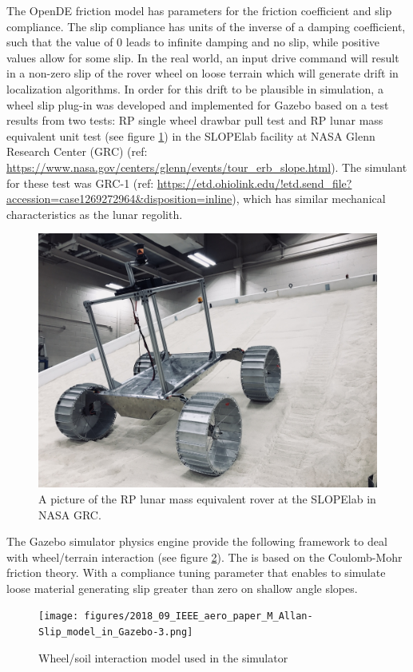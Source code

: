 \documentclass[twocolumn,letterpaper]{IEEEAerospaceCLS}  %
\begin{document}
The OpenDE friction model has parameters for the friction coefficient and slip compliance.
The slip compliance has units of the inverse of a damping coefficient,
such that the value of 0 leads to infinite damping and no slip,
while positive values allow for some slip.
In the real world, an input drive command will result in a non-zero slip of the rover wheel on loose terrain which will generate drift in localization algorithms.
In order for this drift to be plausible in simulation, a wheel slip plug-in was developed and implemented for Gazebo based on a test results from two tests: RP single wheel drawbar pull test and RP lunar mass equivalent unit test (see figure \ref{fig:mgru}) in the SLOPElab facility at NASA Glenn Research Center (GRC) (ref: \url{https://www.nasa.gov/centers/glenn/events/tour_erb_slope.html}). The simulant for these test was GRC-1 (ref: \url{https://etd.ohiolink.edu/!etd.send_file?accession=case1269272964&disposition=inline}), which has similar mechanical characteristics as the lunar regolith. 
\begin{figure}[h!]
	\includegraphics[width=\columnwidth]{figures/wheel_slip_MGRU.JPG}
   	\caption{A picture of the RP lunar mass equivalent rover at the SLOPElab in NASA GRC.}
    \label{fig:mgru}
\end{figure}
The Gazebo simulator physics engine provide the following framework to deal with wheel/terrain interaction (see figure \ref{fig:wheelsoilmodel}). The is based on the Coulomb-Mohr friction theory. With a compliance tuning parameter that enables to simulate loose material generating slip greater than zero on shallow angle slopes.
\begin{figure}[h!]
	\texttt{[image: figures/2018\_09\_IEEE\_aero\_paper\_M\_Allan-Slip\_model\_in\_Gazebo-3.png]}
   	\caption{Wheel/soil interaction model used in the simulator}
    \label{fig:wheelsoilmodel}
\end{figure}
\end{document}
